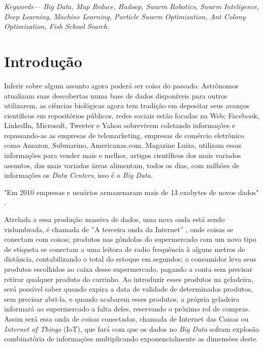 \documentclass[conference,compsoc]{IEEEtran}
\begin{document}
\textit{Keywords— Big Data, Map Reduce, Hadoop, Swarm Robotics, Swarm Inteligence, Deep Learning, Machine Learning, Particle Swarm Optimization, Ant Colony Optimization, Fish School Search}.



%
\IEEEpeerreviewmaketitle



\section{Introdução}

Inferir sobre algum assunto agora poderá ser coisa do passado. Astrônomos atualizam suas descobertas numa base de 
dados disponíveis para outros utilizarem, as ciências biológicas agora tem tradição em depositar seus avanços 
científicos em repositórios públicos, redes sociais estão focadas na Web; Facebook, 
LinkedIn, Microsoft, Tweeter e Yahoo sobrevivem coletando informações e repassando-as as empresas de telemarketing, 
empresas de comércio eletrônico como Amazon, Submarino, Americanas.com, Magazine Luiza, utilizam essas informações 
para vender mais e melhor, artigos científicos dos mais variados assuntos, das mais variadas áreas alimentam, 
todos os dias,  com milhões de informações os \textit{Data Centers}, isso é o \textit{Big Data}.

"Em 2010 empresas e usuários armazenaram mais de 13 exabytes de novos dados" \cite{bigdataQualquerUm}.

Atrelada a essa produção massiva de dados, uma nova onda está sendo vislumbrada, é chamada de ''A terceira onda da Internet''
, onde coisas se conectam com coisas; produtos nas gôndolas do supermercado com um novo tipo de etiqueta se conectam a uma 
leitora de radio frequência à alguns metros de distância, contabilizando o total do estoque em segundos; o consumidor leva 
seus produtos escolhidos ao caixa desse supermercado, pagando a conta sem precisar retirar qualquer produto do carrinho. 
Ao introduzir esses produtos na geladeira, será possível saber quando expira a data de validade de determinados produtos, sem 
precisar abri-la, e quando acabarem esses produtos, a própria geladeira informará ao supermercado a falta deles, reservando 
o próximo rol de compras. Assim será essa onda de coisas conectadas, chamada de Internet das Coisas ou \textit{Internet of Things} (IoT),
que fará com que os dados no \textit{Big Data} sofram explosão combinatória de informações multiplicando exponencialmente as dimensões deste.
\end{document}
